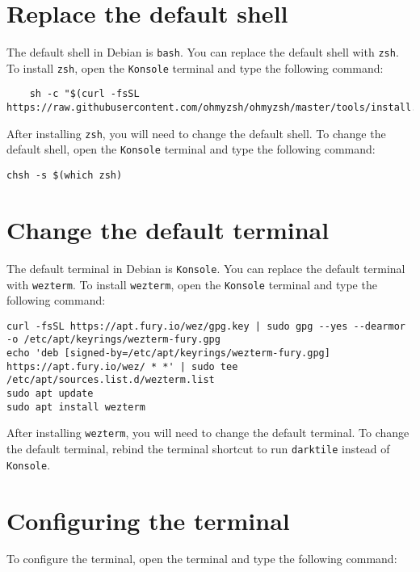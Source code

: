 \section{Replace the default shell}

The default shell in Debian is \texttt{bash}. You can replace the default shell with \texttt{zsh}. To install \texttt{zsh}, open the \texttt{Konsole} terminal and type the following command:

\begin{lstlisting}
    sh -c "$(curl -fsSL https://raw.githubusercontent.com/ohmyzsh/ohmyzsh/master/tools/install.sh)"
\end{lstlisting}

After installing \texttt{zsh}, you will need to change the default shell. To change the default shell, open the \texttt{Konsole} terminal and type the following command:

\begin{lstlisting}
chsh -s $(which zsh)
\end{lstlisting}

\section{Change the default terminal}

The default terminal in Debian is \texttt{Konsole}. You can replace the default terminal with \texttt{wezterm}. To install \texttt{wezterm}, open the \texttt{Konsole} terminal and type the following command:

\begin{lstlisting}
curl -fsSL https://apt.fury.io/wez/gpg.key | sudo gpg --yes --dearmor -o /etc/apt/keyrings/wezterm-fury.gpg
echo 'deb [signed-by=/etc/apt/keyrings/wezterm-fury.gpg] https://apt.fury.io/wez/ * *' | sudo tee /etc/apt/sources.list.d/wezterm.list
sudo apt update
sudo apt install wezterm
\end{lstlisting}

After installing \texttt{wezterm}, you will need to change the default terminal. To change the default terminal, rebind the terminal shortcut to run \texttt{darktile} instead of \texttt{Konsole}.

\section{Configuring the terminal}

To configure the terminal, open the terminal and type the following command:

